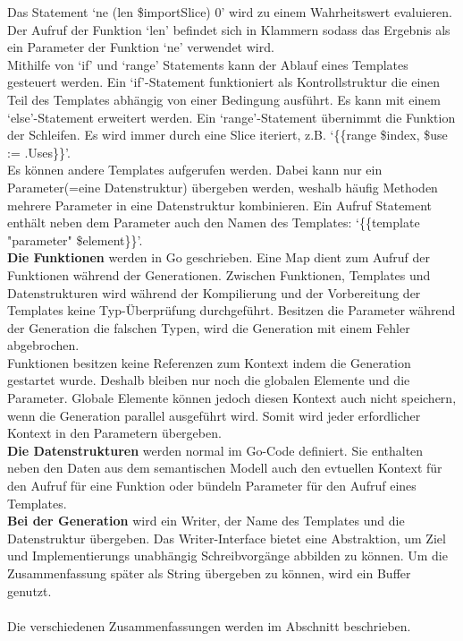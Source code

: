 \documentclass[./einleitung.tex]{subfiles}
\begin{document}
    Das Statement `ne (len \$importSlice) 0' wird zu einem Wahrheitswert evaluieren.
    Der Aufruf der Funktion `len' befindet sich in Klammern sodass das Ergebnis als ein Parameter der Funktion `ne' verwendet wird.\\
    Mithilfe von `if' und `range' Statements kann der Ablauf eines Templates gesteuert werden.
    Ein `if'-Statement funktioniert als Kontrollstruktur die einen Teil des Templates abhängig von einer Bedingung ausführt.
    Es kann mit einem `else'-Statement erweitert werden.
    Ein `range'-Statement übernimmt die Funktion der Schleifen.
    Es wird immer durch eine Slice iteriert, z.B. `\{\{range \$index, \$use := .Uses\}\}'.\\
    Es können andere Templates aufgerufen werden.
    Dabei kann nur ein Parameter(=eine Datenstruktur) übergeben werden, weshalb häufig Methoden mehrere Parameter in eine Datenstruktur kombinieren.
    Ein Aufruf Statement enthält neben dem Parameter auch den Namen des Templates: `\{\{template "parameter" \$element\}\}'.
    \\
    \textbf{Die Funktionen} werden in Go geschrieben.
    Eine Map dient zum Aufruf der Funktionen während der Generationen.
    Zwischen Funktionen, Templates und Datenstrukturen wird während der Kompilierung und der Vorbereitung der Templates keine Typ-Überprüfung durchgeführt.
    Besitzen die Parameter während der Generation die falschen Typen, wird die Generation mit einem Fehler abgebrochen.\\
    Funktionen besitzen keine Referenzen zum Kontext indem die Generation gestartet wurde.
    Deshalb bleiben nur noch die globalen Elemente und die Parameter.
    Globale Elemente können jedoch diesen Kontext auch nicht speichern, wenn die Generation parallel ausgeführt wird.
    Somit wird jeder erfordlicher Kontext in den Parametern übergeben.
    \\
    \textbf{Die Datenstrukturen} werden normal im Go-Code definiert.
    Sie enthalten neben den Daten aus dem semantischen Modell auch den evtuellen Kontext für den Aufruf für eine Funktion oder bündeln Parameter für den Aufruf eines Templates.
    \\
    \textbf{Bei der Generation} wird ein Writer, der Name des Templates und die Datenstruktur übergeben.
    Das Writer-Interface bietet eine Abstraktion, um Ziel und Implementierungs unabhängig Schreibvorgänge abbilden zu können.
    Um die Zusammenfassung später als String übergeben zu können, wird ein Buffer genutzt.
    \\\\
    Die verschiedenen Zusammenfassungen werden im Abschnitt  beschrieben.
\end{document}
